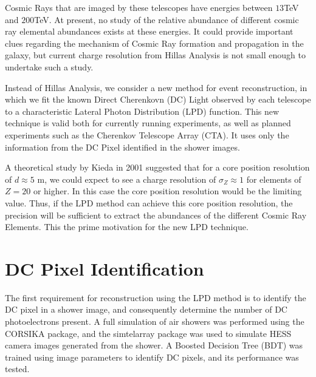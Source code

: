 \documentclass{article}
\begin{document}
Cosmic Rays that are imaged by these telescopes have energies between $13 $TeV and $200 $TeV. At present, no study of the relative abundance of different cosmic ray elemental abundances exists at these energies. It could provide important clues regarding the mechanism of Cosmic Ray formation and propagation in the galaxy, but current charge resolution from Hillas Analysis is not small enough to undertake such a study.

Instead of Hillas Analysis, we consider a new method for event reconstruction, in which we fit the known Direct Cherenkovn (DC) Light observed by each telescope to a characteristic Lateral Photon Distribution (LPD) function. This new technique is valid both for currently running experiments, as well as planned experiments such as the Cherenkov Telescope Array (CTA). It uses only the information from the DC Pixel identified in the shower images.

A theoretical study by Kieda in 2001 \cite{kieda01} suggested that for a core position resolution of $d \approx 5 $ m, we could expect to see a charge resolution of $ \sigma_{Z} \approx 1 $ for elements of $Z = 20$ or higher. In this case the core position resolution would be the limiting value. Thus, if the LPD method can achieve this core position resolution, the precision will be sufficient to extract the abundances of the different Cosmic Ray Elements. This the prime motivation for the new LPD technique.

\section{DC Pixel Identification}
The first requirement for reconstruction using the LPD method is to identify the DC pixel in a shower image, and consequently determine the number of DC photoelectrons present. A full simulation of air showers was performed using the CORSIKA package, and the sim\textunderscore telarray package was used to simulate HESS camera images generated from the shower. A Boosted Decision Tree (BDT) was trained using image parameters to identify DC pixels, and its performance was tested. 
\end{document}
